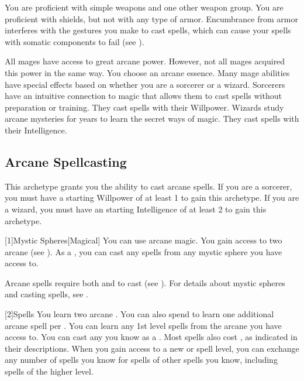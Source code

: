         You are proficient with simple weapons and one other weapon group.
        You are proficient with shields, but not with any type of armor.
        Encumbrance from armor interferes with the gestures you make to cast spells, which can cause your spells with somatic components to fail (see ).

        All mages have access to great arcane power.
        However, not all mages acquired this power in the same way.
        You choose an arcane essence.
        Many mage abilities have special effects based on whether you are a sorcerer or a wizard.
         Sorcerers have an intuitive connection to magic that allows them to cast spells without preparation or training.
        They cast spells with their Willpower.
         Wizards study arcane mysteries for years to learn the secret ways of magic.
        They cast spells with their Intelligence.

    \subsection{Arcane Spellcasting}
        This archetype grants you the ability to cast arcane spells.
        If you are a sorcerer, you must have a starting Willpower of at least 1 to gain this archetype.
        If you are a wizard, you must have an starting Intelligence of at least 2 to gain this archetype.

        [1]{Mystic Spheres}[Magical]
        You can use arcane magic.
        You gain access to two arcane  (see ).
        As a , you can cast any  spells from any mystic sphere you have access to.

        Arcane spells require both  and  to cast (see ).
        For details about mystic spheres and casting spells, see .

        [2]{Spells} You learn two arcane .
        You can also spend  to learn one additional arcane spell per .
        You can learn any 1st level spells from the arcane  you have access to.
        You can cast any  you know as a .
        Most spells also cost , as indicated in their descriptions.
        When you gain access to a new  or spell level, you can exchange any number of spells you know for spells of other spells you know, including spells of the higher level.

